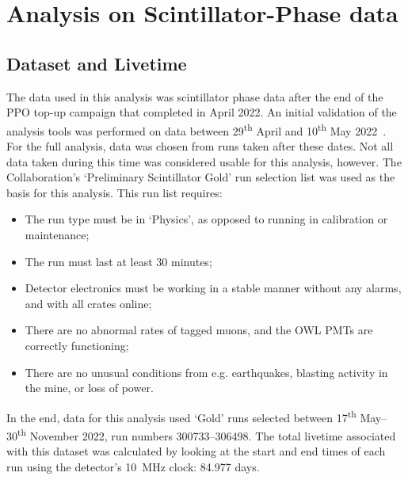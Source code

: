         

\section{Analysis on Scintillator-Phase data}\label{sec:solar_analysis_results}
\subsection{Dataset and Livetime}\label{sec:solar_dataset_livetime}
The data used in this analysis was scintillator phase data after the end of the PPO top-up campaign that completed in April 2022. An initial validation of the analysis tools was performed on data between 29\textsuperscript{th} April and 10\textsuperscript{th} May 2022~\cite{cookmanSolarOscillationAnalysis2023}. %
For the full analysis, data was chosen from runs taken after these dates. Not all data taken during this time was considered usable for this analysis, however. The Collaboration's `Preliminary Scintillator Gold' run selection list was used as the basis for this analysis. This run list requires:
\begin{itemize}
    \item The run type must be in `Physics', as opposed to running in calibration or maintenance;
    \item The run must last at least 30 minutes;
    \item Detector electronics must be working in a stable manner without any alarms, and with all crates online;
    \item There are no abnormal rates of tagged muons, and the OWL PMTs are correctly functioning;
    \item There are no unusual conditions from e.g. earthquakes, blasting activity in the mine, or loss of power. 
\end{itemize}
In the end, data for this analysis used `Gold' runs selected between 17\textsuperscript{th} May--30\textsuperscript{th} November 2022, run numbers 300733--306498. The total livetime associated with this dataset was calculated by looking at the start and end times of each run using the detector's \SI{10}{\MHz} clock: 84.977 days.

